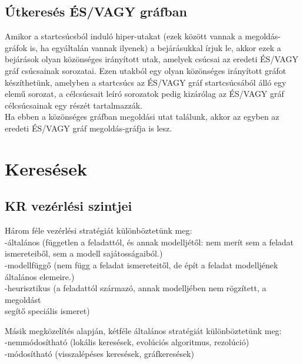 \documentclass{article}
\begin{document}
	 \subsection{Útkeresés ÉS/VAGY gráfban}
	 Amikor a startcsúcsból induló hiper-utakat (ezek között vannak a megoldás-gráfok is, ha egyáltalán vannak ilyenek) a bejárásukkal írjuk le, akkor ezek a bejárások olyan közönséges irányított utak, amelyek csúcsai az eredeti ÉS/VAGY gráf csúcsainak sorozatai. Ezen utakból egy olyan közönséges irányított gráfot készíthetünk, amelyben a startcsúcs az ÉS/VAGY gráf startcsúcsából álló egy elemű sorozat, a célcsúcsait leíró sorozatok pedig kizárólag az ÉS/VAGY gráf célcsúcsainak egy részét tartalmazzák.\\
	 Ha ebben a közönséges gráfban megoldási utat találunk, akkor az egyben az eredeti ÉS/VAGY gráf megoldás-gráfja is lesz.
	 
	 
	 \section{Keresések}
	 
	 \subsection{KR vezérlési szintjei}
	 Három féle vezérlési stratégiát különböztetünk meg:\\
	 -általános (független a feladattól, és annak modelljétől: nem merít sem a feladat\\ \hspace*{0,2em}ismereteiből, sem a modell sajátosságaiból.)\\
	 -modellfüggő (nem függ a feladat ismereteitől, de épít a feladat modelljének\\
	 \hspace*{0,2em} általános elemeire.)\\
	 -heurisztikus (a feladattól származó, annak modelljében nem rögzített, a megoldást\\
	 \hspace*{0,2em} segítő speciális ismeret)
	 
	 Másik megközelítés alapján, kétféle általános stratégiát különböztetünk meg:\\
	 -nemmódosítható (lokális keresések, evolúciós algoritmus, rezolúció)\\
	 -módosítható (visszalépéses keresések, gráfkeresések)
	 
	 \newpage
\end{document}
